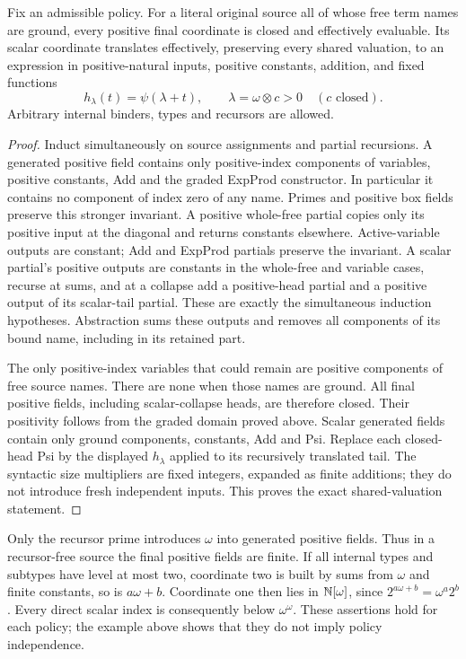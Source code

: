 \begin{theorem}\label{wwsc:thm:translation}
Fix an admissible policy. For a literal original source all of whose free
term names are ground, every positive final coordinate is closed and
effectively evaluable. Its scalar coordinate translates effectively,
preserving every shared valuation, to an expression in positive-natural
inputs, positive constants, addition, and fixed functions
\[
 h_\lambda(t)=\psi(\lambda+t),\qquad
 \lambda=\omega\otimes c>0\quad(c\text{ closed}).
\]
Arbitrary internal binders, types and recursors are allowed.
\end{theorem}
\begin{proof}
Induct simultaneously on source assignments and partial recursions.
A generated positive field contains only positive-index components of
variables, positive constants, Add and the graded ExpProd constructor.
In particular it contains no component of index zero of any name.
Primes and positive box fields preserve this stronger invariant.
A positive whole-free partial copies only its positive input at the
diagonal and returns constants elsewhere. Active-variable outputs are
constant; Add and ExpProd partials preserve the invariant. A scalar
partial's positive outputs are constants in the whole-free and variable
cases, recurse at sums, and at a collapse add a positive-head partial
and a positive output of its scalar-tail partial. These are exactly the
simultaneous induction hypotheses. Abstraction sums these outputs and
removes all components of its bound name, including in its retained part.

The only positive-index variables that could remain are positive
components of free source names. There are none when those names are
ground. All final positive fields, including scalar-collapse heads,
are therefore closed. Their positivity follows from the graded domain
proved above. Scalar generated fields contain only ground components,
constants, Add and Psi. Replace each closed-head Psi by the displayed
$h_\lambda$ applied to its recursively translated tail. The syntactic
size multipliers are fixed integers, expanded as finite additions; they
do not introduce fresh independent inputs. This proves the exact
shared-valuation statement.
\end{proof}

Only the recursor prime introduces $\omega$ into generated positive
fields. Thus in a recursor-free source the final positive fields are
finite. If all internal types and subtypes have level at most two,
coordinate two is built by sums from $\omega$ and finite constants,
so is $a\omega+b$. Coordinate one then lies in $\mathbb N[\omega]$, since
$2^{a\omega+b}=\omega^a2^b$. Every direct scalar index is consequently
below $\omega^\omega$. These assertions hold for each policy; the
example above shows that they do not imply policy independence.

